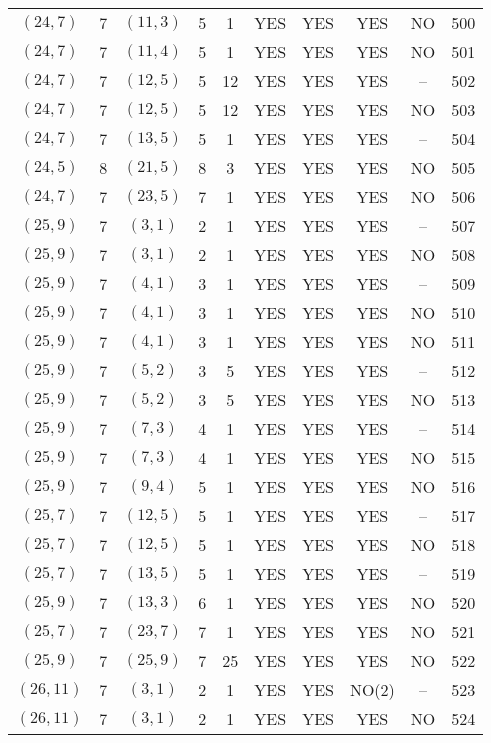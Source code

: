 \begin{longtable}{|c|c|c|c|c|c|c|c|c|c|}
$(24, 7)$ & 7 & $(11, 3)$ & 5 & 1 & YES & YES & YES & NO & 500\\
$(24, 7)$ & 7 & $(11, 4)$ & 5 & 1 & YES & YES & YES & NO & 501\\
$(24, 7)$ & 7 & $(12, 5)$ & 5 & 12 & YES & YES & YES & -- & 502\\
$(24, 7)$ & 7 & $(12, 5)$ & 5 & 12 & YES & YES & YES & NO & 503\\
$(24, 7)$ & 7 & $(13, 5)$ & 5 & 1 & YES & YES & YES & -- & 504\\
$(24, 5)$ & 8 & $(21, 5)$ & 8 & 3 & YES & YES & YES & NO & 505\\
$(24, 7)$ & 7 & $(23, 5)$ & 7 & 1 & YES & YES & YES & NO & 506\\
$(25, 9)$ & 7 & $(3, 1)$ & 2 & 1 & YES & YES & YES & -- & 507\\
$(25, 9)$ & 7 & $(3, 1)$ & 2 & 1 & YES & YES & YES & NO & 508\\
$(25, 9)$ & 7 & $(4, 1)$ & 3 & 1 & YES & YES & YES & -- & 509\\
$(25, 9)$ & 7 & $(4, 1)$ & 3 & 1 & YES & YES & YES & NO & 510\\
$(25, 9)$ & 7 & $(4, 1)$ & 3 & 1 & YES & YES & YES & NO & 511\\
$(25, 9)$ & 7 & $(5, 2)$ & 3 & 5 & YES & YES & YES & -- & 512\\
$(25, 9)$ & 7 & $(5, 2)$ & 3 & 5 & YES & YES & YES & NO & 513\\
$(25, 9)$ & 7 & $(7, 3)$ & 4 & 1 & YES & YES & YES & -- & 514\\
$(25, 9)$ & 7 & $(7, 3)$ & 4 & 1 & YES & YES & YES & NO & 515\\
$(25, 9)$ & 7 & $(9, 4)$ & 5 & 1 & YES & YES & YES & NO & 516\\
$(25, 7)$ & 7 & $(12, 5)$ & 5 & 1 & YES & YES & YES & -- & 517\\
$(25, 7)$ & 7 & $(12, 5)$ & 5 & 1 & YES & YES & YES & NO & 518\\
$(25, 7)$ & 7 & $(13, 5)$ & 5 & 1 & YES & YES & YES & -- & 519\\
$(25, 9)$ & 7 & $(13, 3)$ & 6 & 1 & YES & YES & YES & NO & 520\\
$(25, 7)$ & 7 & $(23, 7)$ & 7 & 1 & YES & YES & YES & NO & 521\\
$(25, 9)$ & 7 & $(25, 9)$ & 7 & 25 & YES & YES & YES & NO & 522\\
$(26, 11)$ & 7 & $(3, 1)$ & 2 & 1 & YES & YES & NO(2) & -- & 523\\
$(26, 11)$ & 7 & $(3, 1)$ & 2 & 1 & YES & YES & YES & NO & 524\\

\end{longtable}
